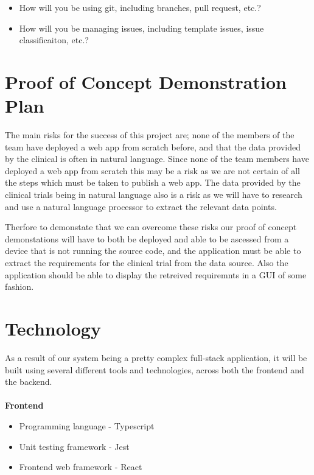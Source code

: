 \documentclass{article}
\begin{document}
\begin{itemize}
	\item How will you be using git, including branches, pull request, etc.?
	\item How will you be managing issues, including template issues, issue
	classificaiton, etc.?
\end{itemize}

\section{Proof of Concept Demonstration Plan}

The main risks for the success of this project are; none of the members of the team have deployed a web app from scratch before, and that the data provided by the clinical is often in natural language. Since none of the team members have deployed a web app from scratch this may be a risk as we are not certain of all the steps which must be taken to publish a web app. The data provided by the clinical trials being in natural language also is a risk as we will have to research and use a natural language processor to extract the relevant data points. 

Therfore to demonstate that we can overcome these risks our proof of concept demonstations will have to both be deployed and able to be ascessed from a device that is not running the source code, and the application must be able to extract the requirements for the clinical trial from the data source. Also the application should be able to display the retreived requiremnts in a GUI of some fashion.

\section{Technology}

As a result of our system being a pretty complex full-stack application, it will be built
using several different tools and technologies, across both the frontend and the backend.
\\~\\
\textbf{Frontend}

\begin{itemize}
	\item Programming language - Typescript
	\item Unit testing framework - Jest
	\item Frontend web framework - React\\
\end{itemize}
\end{document}
